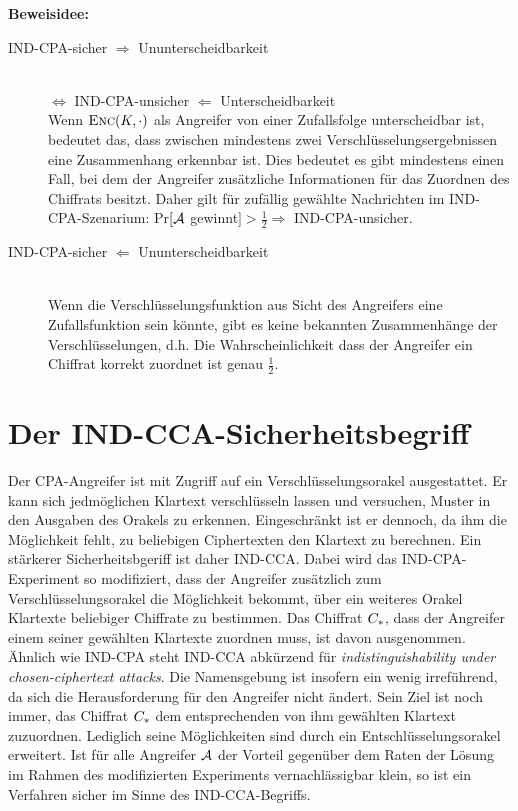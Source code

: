 \noindent
\textbf{Beweisidee:}
\begin{description}
	\item[IND-CPA-sicher $\Rightarrow$ Ununterscheidbarkeit]~\\
		$\Leftrightarrow$ IND-CPA-unsicher $\Leftarrow$ Unterscheidbarkeit~\\
		Wenn $\textsc{Enc}(K, \cdot)$ als Angreifer von einer Zufallsfolge unterscheidbar ist, bedeutet das, dass zwischen mindestens zwei Verschlüsselungsergebnissen eine Zusammenhang erkennbar ist. Dies bedeutet es gibt mindestens einen Fall, bei dem der Angreifer zusätzliche Informationen für das Zuordnen des Chiffrats besitzt. Daher gilt für zufällig gewählte Nachrichten im IND-CPA-Szenarium: Pr$[\mathcal{A}$ gewinnt$] > \frac{1}{2} \Rightarrow$ IND-CPA-unsicher.
	\item[IND-CPA-sicher $\Leftarrow$ Ununterscheidbarkeit]~\\
		Wenn die Verschlüsselungsfunktion aus Sicht des Angreifers eine Zufallsfunktion sein könnte, gibt es keine bekannten Zusammenhänge der Verschlüsselungen, d.h. Die Wahrscheinlichkeit dass der Angreifer ein Chiffrat korrekt zuordnet ist genau $\frac{1}{2}$.
\end{description}

\section{Der IND-CCA-Sicherheitsbegriff}
Der CPA-Angreifer ist mit Zugriff auf ein Verschlüsselungsorakel ausgestattet. Er kann sich jedmöglichen Klartext verschlüsseln lassen und
versuchen, Muster in den Ausgaben des Orakels zu erkennen. Eingeschränkt ist er dennoch, da ihm die Möglichkeit fehlt, zu beliebigen
Ciphertexten den Klartext zu berechnen. Ein stärkerer Sicherheitsbgeriff ist daher IND-CCA. Dabei wird das IND-CPA-Experiment
so modifiziert, dass der Angreifer zusätzlich zum Verschlüsselungsorakel die Möglichkeit bekommt, über ein weiteres Orakel Klartexte
beliebiger Chiffrate zu bestimmen. Das Chiffrat $C_*$, dass der Angreifer einem seiner gewählten Klartexte zuordnen muss, ist davon ausgenommen. Ähnlich wie IND-CPA steht IND-CCA abkürzend für \emph{indistinguishability under chosen-ciphertext attacks}. Die Namensgebung ist insofern ein wenig irreführend, da sich die Herausforderung für den Angreifer nicht ändert. Sein Ziel ist noch immer, das Chiffrat $C_*$ dem entsprechenden von ihm gewählten Klartext zuzuordnen. Lediglich seine Möglichkeiten sind durch ein Entschlüsselungsorakel erweitert.
Ist für alle Angreifer $\mathcal{A}$ der Vorteil gegenüber dem Raten der Lösung im Rahmen des modifizierten Experiments vernachlässigbar klein,
so ist ein Verfahren sicher im Sinne des IND-CCA-Begriffs.